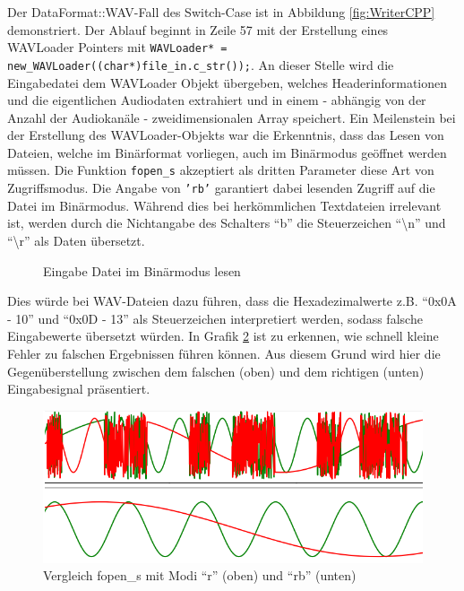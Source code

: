 Der DataFormat::WAV-Fall des Switch-Case ist in Abbildung \ref{fig:WriterCPP} demonstriert. Der Ablauf beginnt in Zeile 57 mit der Erstellung eines WAVLoader Pointers mit \texttt{WAVLoader* = new\_WAVLoader((char*)file\_in.c\_str());}. An dieser Stelle wird die Eingabedatei dem WAVLoader Objekt übergeben, welches Headerinformationen und die eigentlichen Audiodaten extrahiert und in einem - abhängig von der Anzahl der Audiokanäle - zweidimensionalen Array speichert. Ein Meilenstein bei der Erstellung des WAVLoader-Objekts war die Erkenntnis, dass das Lesen von Dateien, welche im Binärformat vorliegen, auch im Binärmodus geöffnet werden müssen. Die Funktion \texttt{fopen\_s} akzeptiert als dritten Parameter diese Art von Zugriffsmodus. Die Angabe von \texttt{'rb'} garantiert dabei lesenden Zugriff auf die Datei im Binärmodus. Während dies bei herkömmlichen Textdateien irrelevant ist, werden durch die Nichtangabe des Schalters \enquote{b} die Steuerzeichen \enquote{\textbackslash n} und \enquote{\textbackslash r} als Daten übersetzt. 

\begin{figure}[h!]
	
	\caption{Eingabe Datei im Binärmodus lesen}
	\label{fig:openFile}
\end{figure}

Dies würde bei WAV-Dateien dazu führen, dass die Hexadezimalwerte z.B. \enquote{0x0A - 10} und \enquote{0x0D - 13} als Steuerzeichen interpretiert werden, sodass falsche Eingabewerte übersetzt würden. In Grafik \ref{fig:differenceGraph} ist zu erkennen, wie schnell kleine Fehler zu falschen Ergebnissen führen können. Aus diesem Grund wird hier die Gegenüberstellung zwischen dem falschen (oben) und dem richtigen (unten) Eingabesignal präsentiert.

\begin{figure}[hbt!]
	\centering      
	\includegraphics[scale=0.5]{figures/layerDifference.png}
	\caption{Vergleich fopen\_s mit Modi \enquote{r} (oben) und \enquote{rb} (unten)}
	\label{fig:differenceGraph}
\end{figure}

